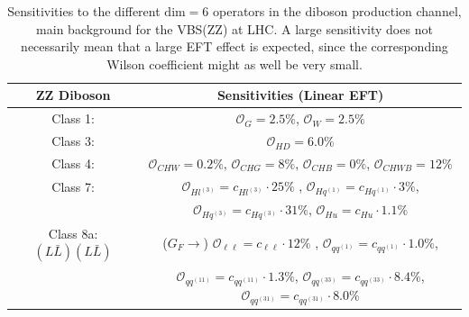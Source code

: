 \documentclass[../report.tex]{subfiles}
\begin{document}
\begin{table}[]
\begin{center}
\small
\begin{tabular}{|c|c|}%
\hline
ZZ Diboson & Sensitivities (Linear EFT) \\
\hline
 Class 1:  &  $\mathcal{O}_G = 2.5 \%$, \quad $\mathcal{O}_W = 2.5 \%$ \\
Class 3: & $\mathcal{O}_{HD} = 6.0 \%$ \\
Class 4: & $ \mathcal{O}_{CHW} = 0.2 \% $, $ \mathcal{O}_{CHG} =  8 \% $, $ \mathcal{O}_{CHB} =  0 \% $, $ \mathcal{O}_{CHWB} =  12 \% $ \\
Class 7: & $ \mathcal{O}_{Hl^{(3)}} = c_{Hl^{(3)}} \cdot 25 \% $ ,
$ \mathcal{O}_{Hq^{(1)}} = c_{Hq^{(1)}} \cdot 3 \% $, \\ & 
$ \mathcal{O}_{Hq^{(3)}} = c_{Hq^{(3)}} \cdot 31 \% $,
$ \mathcal{O}_{Hu} = c_{Hu} \cdot 1.1 \% $
\\
Class 8a: $(L \bar{L})(L \bar{L})$  &  ($G_F \to$) $ \mathcal{O}_{\ell \ell} = c_{\ell \ell} \cdot 12 \% $ , $ \mathcal{O}_{qq^{(1)}} = c_{qq^{(1)}} \cdot 1.0 \% $, \\ &
$ \mathcal{O}_{qq^{(11)}} = c_{qq^{(11)}} \cdot 1.3 \% $, 
$ \mathcal{O}_{qq^{(33)}} = c_{qq^{(33)}} \cdot 8.4 \% $, 
$ \mathcal{O}_{qq^{(31)}} = c_{qq^{(31)}} \cdot 8.0 \% $
\\
\hline
 \end{tabular}
  \caption{Sensitivities to the different $\mathrm{dim=6}$ operators in the diboson production channel, main background for the VBS(ZZ) at LHC. A large sensitivity does not necessarily mean that a large EFT effect is expected, since the corresponding Wilson coefficient might as well be very small. %
  }
  \label{tab:background}
\end{center}
\end{table}


 

\end{document}
